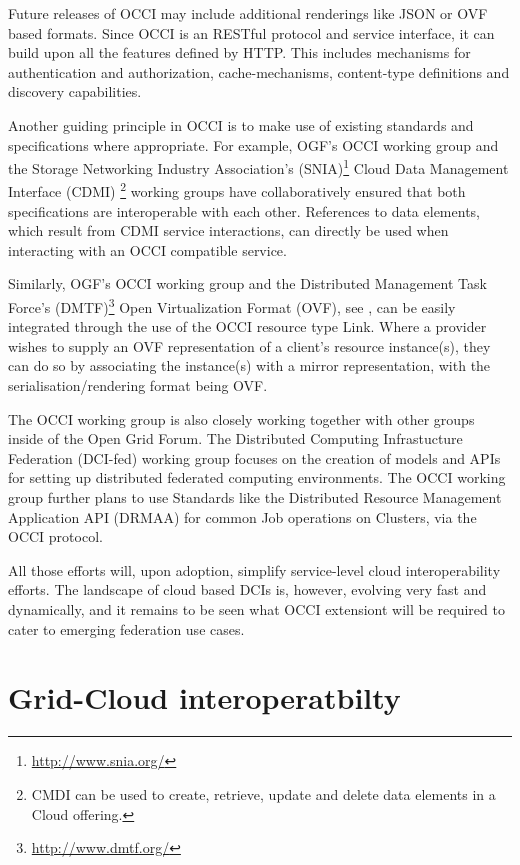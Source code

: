 \documentclass[10pt,conference,final,letterpaper,twoside,twocolumn,]{IEEEtran}
\begin{document}
Future releases of OCCI may include additional renderings like JSON or
OVF based formats. Since OCCI is an RESTful protocol and service
interface, it can build upon all the features defined by HTTP. This
includes mechanisms for authentication and authorization,
cache-mechanisms, content-type definitions and discovery capabilities.

Another guiding principle in OCCI is to make use of existing standards
and specifications where appropriate.  For example, OGF's OCCI working
group and the Storage Networking Industry Association's
(SNIA)\footnote{\url{http://www.snia.org/}} Cloud Data Management
Interface (CDMI) \footnote{CMDI can be used to create, retrieve,
  update and delete data elements in a Cloud offering.} working groups
have collaboratively ensured that both specifications are
interoperable with each other. References to data elements, which
result from CDMI service interactions, can directly be used when
interacting with an OCCI compatible service.

Similarly, OGF's OCCI working group and the Distributed Management
Task Force's (DMTF)\footnote{\url{http://www.dmtf.org/}} Open
Virtualization Format (OVF), see \cite{CDG+2009}, can be easily
integrated through the use of the OCCI resource type Link. Where a
provider wishes to supply an OVF representation of a client's resource
instance(s), they can do so by associating the instance(s) with a
mirror representation, with the serialisation/rendering format being
OVF.

The OCCI working group is also closely working together with other
groups inside of the Open Grid Forum. The Distributed Computing
Infrastucture Federation (DCI-fed) working group focuses on the
creation of models and APIs for setting up distributed federated
computing environments. The OCCI working group further plans to use
Standards like the Distributed Resource Management Application API
(DRMAA) for common Job operations on Clusters, via the OCCI protocol.

All those efforts will, upon adoption, simplify service-level cloud
interoperability efforts.  The landscape of cloud based DCIs is,
however, evolving very fast and dynamically, and it remains to be seen
what OCCI extensiont will be required to cater to emerging federation
use cases.

\section{Grid-Cloud interoperatbilty}
\label{sec:gcinterop}
\end{document}
